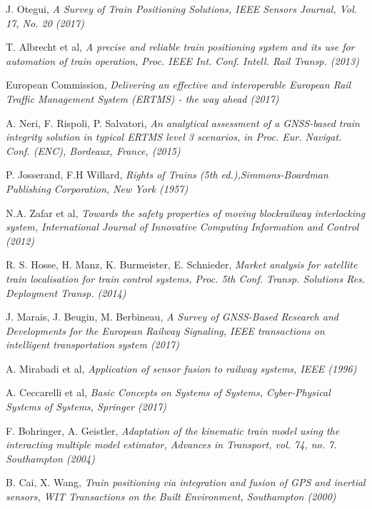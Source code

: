 \begin{thebibliography}{9}
J. Otegui, \textit{A Survey of Train Positioning Solutions, IEEE Sensors Journal, Vol. 17, No. 20 (2017)}

T. Albrecht et al, \textit{A precise and reliable train positioning system and its use for automation of train
operation, Proc. IEEE Int. Conf. Intell. Rail Transp. (2013)}

European Commission, \textit{
	Delivering an effective and interoperable European Rail Traffic Management System
	(ERTMS) - the way ahead (2017)}

A. Neri, F. Rispoli, P. Salvatori, \textit{An analytical assessment of
a GNSS-based train integrity solution in typical ERTMS level 3
scenarios, in Proc. Eur. Navigat. Conf. (ENC), Bordeaux, France, (2015)}

 P. Josserand, F.H Willard, \textit{Rights of Trains (5th ed.),Simmons-Boardman Publishing Corporation, New York (1957)}
 
N.A. Zafar et al, \textit{Towards the safety properties of moving blockrailway interlocking system, International Journal of Innovative Computing Information and Control (2012)}

R. S. Hosse, H. Manz, K. Burmeister, E. Schnieder, \textit{Market
analysis for satellite train localisation for train control systems,
Proc. 5th Conf. Transp. Solutions Res. Deployment Transp. (2014)}

J. Marais, J. Beugin, M. Berbineau, \textit{A Survey of GNSS-Based Research and
	Developments for the European Railway Signaling, IEEE transactions on intelligent transportation system (2017)}

A. Mirabadi et al, \textit{Application of sensor fusion to railway systems, IEEE (1996)}

A. Ceccarelli et al, \emph{Basic Concepts on Systems of Systems, Cyber-Physical Systems of Systems, Springer (2017)}

F. Bohringer, A. Geistler, \textit{Adaptation of the kinematic train
	model using the interacting multiple model estimator, Advances in
	Transport, vol. 74, no. 7. Southampton (2004)}

B. Cai, X. Wang, \textit{Train positioning via integration and
fusion of GPS and inertial sensors, WIT Transactions on the Built Environment, Southampton (2000)}


\end{thebibliography}
